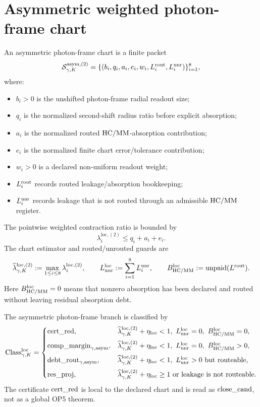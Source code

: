 \section{Asymmetric weighted photon-frame chart}

\begin{definition}
An asymmetric photon-frame chart is a finite packet
\[
\mathcal S_{\gamma,K}^{\mathrm{asym},(2)}
=
\{(b_i,q_i,a_i,e_i,w_i,L_i^{\mathrm{rout}},L_i^{\mathrm{unr}})\}_{i=1}^{8},
\]
where:
\begin{itemize}
 \item \(b_i>0\) is the unshifted photon-frame radial readout size;
 \item \(q_i\) is the normalized second-shift radius ratio before explicit absorption;
 \item \(a_i\) is the normalized routed \(\mathrm{HC}/\mathrm{MM}\)-absorption contribution;
 \item \(e_i\) is the normalized finite chart error/tolerance contribution;
 \item \(w_i>0\) is a declared non-uniform readout weight;
 \item \(L_i^{\mathrm{rout}}\) records routed leakage/absorption bookkeeping;
 \item \(L_i^{\mathrm{unr}}\) records leakage that is not routed through an admissible \(\mathrm{HC}/\mathrm{MM}\) register.
\end{itemize}
The pointwise weighted contraction ratio is bounded by
\[
\lambda_i^{\mathrm{loc},(2)}
\le q_i+a_i+e_i.
\]
The chart estimator and routed/unrouted guards are
\[
\widehat\lambda_{\gamma,K}^{\mathrm{loc},(2)}
:=\max_{1\le i\le 8}\lambda_i^{\mathrm{loc},(2)},
\qquad
L_{\mathrm{unr}}^{\mathrm{loc}}:=\sum_{i=1}^{8}L_i^{\mathrm{unr}},
\qquad
B_{\mathrm{HC}/\mathrm{MM}}^{\mathrm{loc}}:=\mathrm{unpaid}(L^{\mathrm{rout}}).
\]
Here \(B_{\mathrm{HC}/\mathrm{MM}}^{\mathrm{loc}}=0\) means that nonzero absorption has been declared and routed without leaving residual absorption debt.
\end{definition}

\begin{definition}
The asymmetric photon-frame branch is classified by
\[
\mathrm{Class}_{\gamma,K}^{\mathrm{loc}}
=
\begin{cases}
\mathrm{cert\_red}, & \widehat\lambda_{\gamma,K}^{\mathrm{loc},(2)}+\eta_{\mathrm{loc}}<1,
 \ L_{\mathrm{unr}}^{\mathrm{loc}}=0,
 \ B_{\mathrm{HC}/\mathrm{MM}}^{\mathrm{loc}}=0,\\[2mm]
\mathrm{comp\_margin}_{\gamma,\mathrm{asym}}, & \widehat\lambda_{\gamma,K}^{\mathrm{loc},(2)}+\eta_{\mathrm{loc}}<1,
 \ L_{\mathrm{unr}}^{\mathrm{loc}}=0,
 \ B_{\mathrm{HC}/\mathrm{MM}}^{\mathrm{loc}}>0,\\[2mm]
\mathrm{debt\_rout}_{\gamma,\mathrm{asym}}, & \widehat\lambda_{\gamma,K}^{\mathrm{loc},(2)}+\eta_{\mathrm{loc}}<1,
 \ L_{\mathrm{unr}}^{\mathrm{loc}}>0\text{ but routeable},\\[2mm]
\mathrm{res\_proj}, & \widehat\lambda_{\gamma,K}^{\mathrm{loc},(2)}+\eta_{\mathrm{loc}}\ge 1
 \text{ or leakage is not routeable.}
\end{cases}
\]
The certificate \(\mathrm{cert\_red}\) is local to the declared chart and is read as \(\mathrm{close\_cand}\), not as a global OP5 theorem.
\end{definition}

